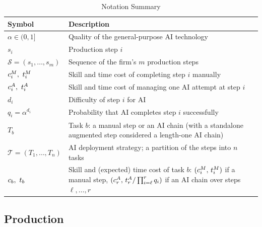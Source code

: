 \begin{table}[ht!]
\centering
\caption{Notation Summary}
\label{tab:model_parameters}
\begin{tabularx}{\textwidth}{l X}
\toprule
\textbf{Symbol} & \textbf{Description} \\
\midrule
$\alpha \in (0,1]$ & Quality of the general-purpose AI technology \\
\addlinespace
$s_i$ & Production step $i$ \\
$\mathcal{S} = (s_1, \dotsc, s_m)$ & Sequence of the firm's $m$ production steps \\
$c^{M}_{i},\ t^{M}_{i}$ & Skill and time cost of completing step $i$ manually \\
$\AIskill{i},\ \AItime{i}$ & Skill and time cost of managing one AI attempt at step $i$ \\
$d_i$ & Difficulty of step $i$ for AI \\
$q_i = \alpha^{d_i}$ & Probability that AI completes step $i$ successfully \\
\addlinespace
\addlinespace
$T_b$ & Task $b$: a manual step or an AI chain (with a standalone augmented step considered a length-one AI chain) \\
$\mathcal{T} = (T_1, \dotsc, T_n)$ & AI deployment strategy; a partition of the steps into $n$ tasks \\
$\skillcost{b},\ \timecost{b}$ & Skill and (expected) time cost of task $b$: $(c^{M}_{i},\, t^{M}_{i})$ if a manual step, $(c^{A}_{r},\, t^{A}_{r}/\prod_{i=\ell}^{r} q_i)$ if an AI chain over steps $\ell, \dotsc, r$ \\
\bottomrule
\end{tabularx}
\end{table}



\subsection{Production}
\label{sec:jobs_wages}


